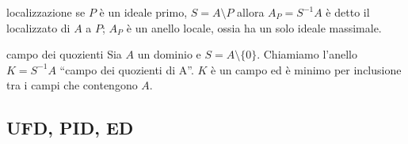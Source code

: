 \begin{definition}{localizzazione}
    se $P$ è un ideale primo, $S = A \setminus P$ allora $A_P = S^{-1}A$ è detto il localizzato di $A$ a $P$; $A_P$ è un anello locale, ossia ha un solo ideale massimale.
\end{definition}
\begin{definition}{campo dei quozienti}
    Sia $A$ un dominio e $S = A \setminus \{0\}$. Chiamiamo l'anello $K = S^{-1}A$ ``campo dei quozienti di A''. $K$ è un campo ed è minimo per inclusione tra i campi che contengono $A$.
\end{definition}

\subsection{UFD, PID, ED}

